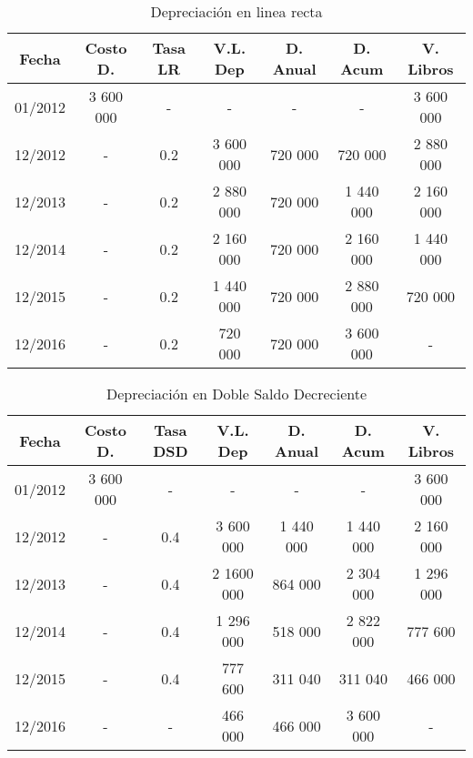 \documentclass[10pt,a4paper]{report}
\begin{document}
	\begin{table}[h]
	\centering
	\caption{Depreciación en linea recta}	
	
	\begin{tabular}{|c|c|c|c|c|c|c|} \hline
	
	Fecha   & Costo D.  & Tasa LR & V.L. Dep  & D. Anual & D. Acum   & V. Libros \\ \hline

	01/2012 & 3 600 000 & -       & -         & -        & -         & 3 600 000 \\ \hline

	12/2012 & -         & 0.2     & 3 600 000 & 720 000  & 720 000   & 2 880 000 \\ \hline

	12/2013 & -         & 0.2     & 2 880 000 & 720 000  & 1 440 000 & 2 160 000 \\ \hline

	12/2014 & -         & 0.2     & 2 160 000 & 720 000  & 2 160 000 & 1 440 000 \\ \hline

	12/2015 & -         & 0.2     & 1 440 000 & 720 000  & 2 880 000 & 720 000   \\ \hline

	12/2016 & -         & 0.2     & 720 000   & 720 000  & 3 600 000 & -         \\ \hline
	\end{tabular}
	\end{table}
		\begin{table}[h]
	\centering
	\caption{Depreciación en Doble Saldo Decreciente}	
	
	\begin{tabular}{|c|c|c|c|c|c|c|} \hline
	
	Fecha   & Costo D.  & Tasa DSD & V.L. Dep   & D. Anual  & D. Acum   & V. Libros \\ \hline

	01/2012 & 3 600 000 & -        & -          & -         & -         & 3 600 000 \\ \hline

	12/2012 & -         & 0.4      & 3 600 000  & 1 440 000 & 1 440 000 & 2 160 000 \\ \hline

	12/2013 & -         & 0.4      & 2 1600 000 & 864 000   & 2 304 000 & 1 296 000 \\ \hline

	12/2014 & -         & 0.4      & 1 296 000  & 518 000   & 2 822 000 & 777 600   \\ \hline

	12/2015 & -         & 0.4      & 777 600    & 311 040   & 311 040   & 466 000   \\ \hline

	12/2016 & -         & -        & 466 000    & 466 000   & 3 600 000 & -         \\ \hline
	\end{tabular}
	\end{table}
\end{document}
